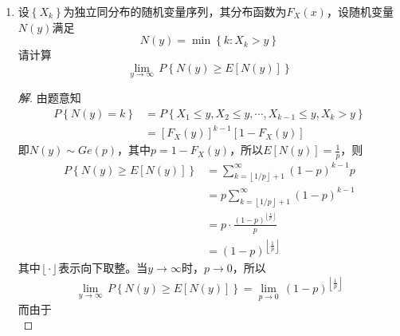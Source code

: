 \documentclass[12pt]{article}
\newcommand{\hei}{\CJKfamily{hei}}                          %
\begin{document}
\begin{enumerate}
\newpage
\item {\hei 设$ \left\{ {{X}_{k}} \right\} $为独立同分布的随机变量序列，其分布函数为$ {{F}_{X}}\left( x \right) $，设随机变量$ N(y) $满足
	\begin{equation}\nonumber
	N\left( y \right)=\min \left\{ k:{{X}_{k}}>y \right\}
	\end{equation}
	请计算
	\begin{equation}\nonumber
	\underset{y\to \infty }{\mathop{\lim }}\,P\left\{ N\left( y \right)\ge E\left[ N\left( y \right) \right] \right\}
	\end{equation}}
\begin{proof}[解]
	由题意知
	\begin{equation}
	\begin{aligned}
	P\left\{ N\left( y \right)=k \right\}&=P\left\{ {{X}_{1}}\le y,{{X}_{2}}\le y,\cdots ,{{X}_{k-1}}\le y,{{X}_{k}}>y \right\} \\ 
	& ={{\left[ {{F}_{X}}\left( y \right) \right]}^{k-1}}\left[ 1-{{F}_{X}}\left( y \right) \right]
	\end{aligned}
	\end{equation}
	即$ N\left( y \right)\sim Ge\left( p \right) $，其中$ p = 1-{{F}_{X}}\left( y \right) $，所以$ E\left[ N\left( y \right) \right]=\displaystyle{\frac{1}{p}} $，则
	\begin{equation}
	\begin{aligned}
	P\left\{ N\left( y \right)\ge E\left[ N\left( y \right) \right] \right\}&=\sum\limits_{k=\left\lfloor 1/p \right\rfloor +1}^{\infty }{{{\left( 1-p \right)}^{k-1}}p} \\ 
	& =p\sum\limits_{k=\left\lfloor 1/p \right\rfloor +1}^{\infty }{{{\left( 1-p \right)}^{k-1}}} \\ 
	& = p\cdot \frac{{{\left( 1-p \right)}^{\left\lfloor \frac{1}{p} \right\rfloor}}}{p} \\ 
	& ={{\left( 1-p \right)}^{\left\lfloor \frac{1}{p} \right\rfloor}}
	\end{aligned}
	\end{equation}
	其中$ \left\lfloor \cdotp  \right\rfloor $表示向下取整。当$ y\longrightarrow\infty $时，$ p\longrightarrow 0 $，所以
	\begin{equation}
	\underset{y\to \infty }{\mathop{\lim }}\,P\left\{ N\left( y \right)\ge E\left[ N\left( y \right) \right] \right\}=\underset{p\to 0}{\mathop{\lim }}\,{{\left( 1-p \right)}^{\left\lfloor \frac{1}{p} \right\rfloor}}
	\end{equation}
	而由于
	\begin{equation}

\end{equation}
\end{proof}
\end{enumerate}
\end{document}
